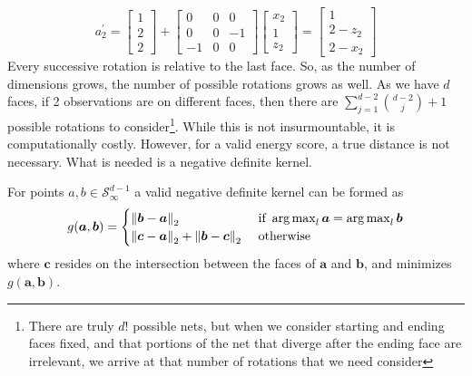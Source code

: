   \begin{equation}
    \label{eq:2drotation}
    a_2^{\prime} = \begin{bmatrix}
    1 \\
    2 \\
    2
    \end{bmatrix}
    +
    \begin{bmatrix}
    0 & 0 & 0  \\
    0 & 0 & -1 \\
    -1 & 0 & 0
    \end{bmatrix}
    \begin{bmatrix}
    x_2 \\
    1 \\
    z_2
    \end{bmatrix} = \begin{bmatrix}
    1 \\
    2 - z_2 \\
    2 - x_2
    \end{bmatrix}
  \end{equation}
Every successive rotation is relative to the last face.  So, as the number of dimensions grows, the
  number of possible rotations grows as well.  As we have $d$ faces, if 2 observations are on
  different faces, then there are $\sum_{j = 1}^{d-2}\binom{d-2}{j} + 1$ possible rotations to
  consider\footnote{There are truly $d!$ possible nets, but when we consider starting and ending
  faces fixed, and that portions of the net that diverge after the ending face are irrelevant,
  we arrive at that number of rotations that we need consider}.  While this is not
  insurmountable, it is computationally costly. However, for a valid energy score, a true distance
  is not necessary.  What is needed is a negative definite kernel.
  
\begin{prop}
For points $a,b \in \mathcal{S}_{\infty}^{d-1}$ a valid negative definite kernel can be formed as
  \begin{equation}
    g(\bm{a},\bm{b}) = \begin{cases}
        \left\lVert \bm{b}-\bm{a} \right\rVert_{2} &\text{ if }\operatorname*{arg\,max}_l\bm{a} = \operatorname*{arg\,max}_l\bm{b}\\
        \left\lVert \bm{c}-\bm{a} \right\rVert_{2} + \left\lVert \bm{b}-\bm{c} \right\rVert_{2} &\text{ otherwise}
    \end{cases}
  \end{equation}
  where $\bm{c}$ resides on the intersection between the faces of $\bm{a}$ and $\bm{b}$, and minimizes $g(\bm{a},\bm{b})$.
\end{prop}

